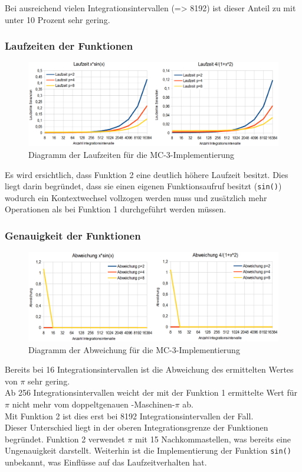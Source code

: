\documentclass[a4paper,12pt]{scrartcl}
\begin{document}
Bei ausreichend vielen Integrationsintervallen (=> 8192) ist dieser Anteil zu mit unter 10 Prozent sehr gering.

\subsubsection{Laufzeiten der Funktionen}
\begin{figure}[htb]
  \begin{center}
    \includegraphics[width=1\hsize]{../mc3_laufzeit.png}
  \end{center}
  \caption{\label{mc3genauigkeit}
    Diagramm der Laufzeiten f\"ur die MC-3-Implementierung}
\end{figure}
Es wird ersichtlich, dass Funktion 2 eine deutlich h\"ohere Laufzeit besitzt. Dies liegt darin begr\"undet, dass sie einen eigenen Funktionsaufruf
besitzt (\texttt{sin()}) wodurch ein Kontextwechsel vollzogen werden muss und zus\"atzlich mehr Operationen als bei Funktion 1 durchgef\"uhrt werden m\"ussen.

\subsubsection{Genauigkeit der Funktionen}
\begin{figure}[htb]
  \begin{center}
    \includegraphics[width=1\hsize]{../mc3_abweichung.png}
  \end{center}
  \caption{\label{mc3genauigkeit}
    Diagramm der Abweichung f\"ur die MC-3-Implementierung}
\end{figure}
Bereits bei 16 Integrationsintervallen ist die Abweichung des ermittelten Wertes von $\pi$ sehr gering.\\
Ab 256 Integrationsintervallen weicht der mit der Funktion 1 ermittelte Wert f\"ur $\pi$ nicht mehr vom doppeltgenauen -Maschinen-$\pi$ ab.\\
Mit Funktion 2 ist dies erst bei 8192 Integrationsintervallen der Fall.\\
Dieser Unterschied liegt in der oberen Integrationsgrenze der Funktionen begr\"undet. Funktion 2 verwendet $\pi$ mit 15 Nachkommastellen, was bereits eine
Ungenauigkeit darstellt. Weiterhin ist die Implementierung der Funktion \texttt{sin()} unbekannt, was Einfl\"usse auf das Laufzeitverhalten hat.
\end{document}
